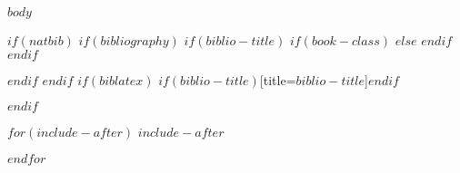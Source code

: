 \documentclass[$if(fontsize)$$fontsize$,$endif$$if(lang)$$babel-lang$,$endif$$if(papersize)$$papersize$paper,$endif$$if(beamer)$ignorenonframetext,$if(handout)$handout,$endif$$if(aspectratio)$aspectratio=$aspectratio$,$endif$$endif$$for(classoption)$$classoption$$sep$,$endfor$]{$documentclass$}
\begin{document}
$body$

{ \hypersetup{
  colorlinks=true,       %
  linkcolor=Maroon,        %
  citecolor=Maroon,        %
  filecolor=black,     %
  urlcolor=Maroon         
}
$if(natbib)$
$if(bibliography)$
$if(biblio-title)$
$if(book-class)$
\renewcommand\bibname{$biblio-title$}
$else$
\renewcommand\refname{$biblio-title$}
$endif$
$endif$

$endif$
$endif$
$if(biblatex)$
\printbibliography$if(biblio-title)$[title=$biblio-title$]$endif$

$endif$
}

$for(include-after)$
$include-after$

$endfor$
\end{document}
